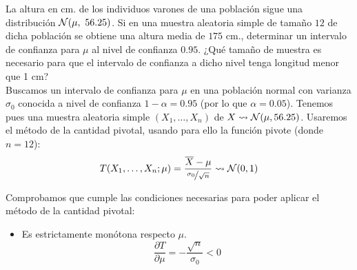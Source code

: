 \begin{ejercicio}
    La altura en cm. de los individuos varones de una población sigue una distribución $\mathcal{N}(\mu,\ 56.25)$. Si en una muestra aleatoria simple de tamaño $12$ de dicha población se obtiene una altura media de $175$ cm., determinar un intervalo de confianza para $\mu$ al nivel de confianza $0.95$. ¿Qué tamaño de muestra es necesario para que el intervalo de confianza a dicho nivel tenga longitud menor que 1 cm?\\

    \noindent
    Buscamos un intervalo de confianza para $\mu$ en una población normal con varianza $\sigma_0$ conocida a nivel de confianza $1-\alpha = 0.95$ (por lo que $\alpha= 0.05$). Tenemos pues una muestra aleatoria simple $(X_1, \ldots, X_n)$ de $X\rightsquigarrow\mathcal{N}(\mu,56.25)$. Usaremos el método de la cantidad pivotal, usando para ello la función pivote (donde $n=12$):
    \begin{equation*}
        T(X_1, \ldots, X_n; \mu) = \frac{\overline{X}-\mu}{\nicefrac{\sigma_0}{\sqrt{n}}} \rightsquigarrow\mathcal{N}(0,1)
    \end{equation*}
    
    Comprobamos que cumple las condiciones necesarias para poder aplicar el método de la cantidad pivotal:
    \begin{itemize}
        \item Es estrictamente monótona respecto $\mu$.
        \begin{equation*}
            \frac{\partial T}{\partial \mu} = -\frac{\sqrt{n}}{\sigma_0} < 0
        \end{equation*}


\end{itemize}
\end{ejercicio}
